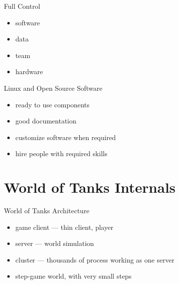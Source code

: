 \documentclass[aspectratio=169]{beamer}
\begin{document}
\begin{frame}{Full Control}
    \begin{itemize}
        \item software
        \item data
        \item team
        \item hardware
    \end{itemize}
\end{frame}

\begin{frame}{Linux and Open Source Software}
    \begin{itemize}
        \item ready to use components 
        \item good documentation
        \item customize software when required
        \item hire people with required skills
    \end{itemize}
\end{frame}

\section{World of Tanks Internals}
{
\begin{frame}[plain]{}
\end{frame}
}
\begin{frame}{World of Tanks Architecture}
    \begin{itemize}
        \item game client --- thin client, player
        \item server --- world simulation
        \item cluster --- thousands of process working as one server
        \item step-game world, with very small steps
    \end{itemize}
\end{frame}
\end{document}
